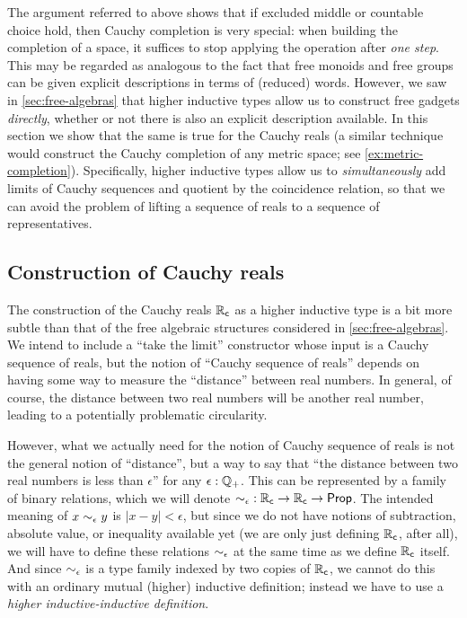 The argument referred to above shows that if excluded middle or countable choice hold, then Cauchy completion is very special: when building the completion of a space, it suffices to stop applying the operation after \emph{one step}.
This may be regarded as analogous to the fact that free monoids and free groups can be given explicit descriptions in terms of (reduced) words.
However, we saw in \cref{sec:free-algebras} that higher inductive types allow us to construct free gadgets \emph{directly}, whether or not there is also an explicit description available.
In this section we show that the same is true for the Cauchy reals (a similar technique would construct the Cauchy completion of any metric space; see \cref{ex:metric-completion}).
Specifically, higher inductive types allow us to \emph{simultaneously} add limits of Cauchy sequences and quotient by the coincidence relation, so that we can avoid the problem of lifting a sequence of reals to a sequence of representatives.
%


\subsection{Construction of Cauchy reals}
\label{sec:constr-cauchy-reals}

The construction of the Cauchy reals $\mathbb{R}_\mathsf{c}$ as a higher inductive type is a bit more subtle than that of the free algebraic structures considered in \cref{sec:free-algebras}.
We intend to include a ``take the limit'' constructor whose input is a Cauchy sequence of reals, but the notion of ``Cauchy sequence of reals'' depends on having some way to measure the ``distance'' between real numbers.
In general, of course, the distance between two real numbers will be another real number, leading to a potentially problematic circularity.

However, what we actually need for the notion of Cauchy sequence of reals is not the general notion of ``distance'', but a way to say that ``the distance between two real numbers is less than $\epsilon$'' for any $\epsilon:\mathbb{Q}_{+}$.
This can be represented by a family of binary relations, which we will denote $\mathord{\sim_{\epsilon}} : \mathbb{R}_\mathsf{c}\to\mathbb{R}_\mathsf{c}\to \mathsf{Prop}$.
The intended meaning of $x \sim_{\epsilon} y$ is $|x - y| < \epsilon$, but since we do not have notions of subtraction, absolute value, or inequality available yet (we are only just defining $\mathbb{R}_\mathsf{c}$, after all), we will have to define these relations $\sim_{\epsilon}$ at the same time as we define $\mathbb{R}_\mathsf{c}$ itself.
And since $\sim_{\epsilon}$ is a type family indexed by two copies of $\mathbb{R}_\mathsf{c}$, we cannot do this with an ordinary mutual (higher) inductive definition; instead we have to use a \emph{higher inductive-inductive definition}.

